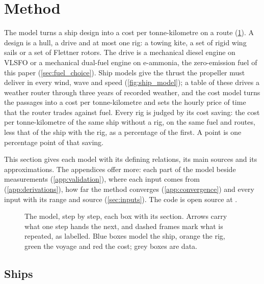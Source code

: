 \section{Method}
\label{sec:model}

The model turns a ship design into a cost per tonne-kilometre on a route (\cref{fig:pipeline}). A design is a hull, a drive and at most one rig: a towing kite, a set of rigid wing sails or a set of Flettner rotors. The drive is a mechanical diesel engine on VLSFO or a mechanical dual-fuel engine on e-ammonia, the zero-emission fuel of this paper (\cref{sec:fuel_choice}). Ship models give the thrust the propeller must deliver in every wind, wave and speed (\cref{fig:ship_model}); a table of these drives a weather router through three years of recorded weather, and the cost model turns the passages into a cost per tonne-kilometre and sets the hourly price of time that the router trades against fuel. Every rig is judged by its cost saving: the cost per tonne-kilometre of the same ship without a rig, on the same fuel and routes, less that of the ship with the rig, as a percentage of the first. A point is one percentage point of that saving.

This section gives each model with its defining relations, its main sources and its approximations. The appendices offer more: each part of the model beside measurements (\cref{app:validation}), where each input comes from (\cref{app:derivations}), how far the method converges (\cref{app:convergence}) and every input with its range and source (\cref{sec:inputs}). The code is open source at \urlof{\repository}.

\begin{figure}[tbp]
\centering

\caption{The model, step by step, each box with its section. Arrows carry what one step hands the next, and dashed frames mark what is repeated, as labelled. Blue boxes model the ship, orange the rig, green the voyage and red the cost; grey boxes are data.}
\label{fig:pipeline}
\end{figure}

\subsection{Ships}
\label{sec:ships}

